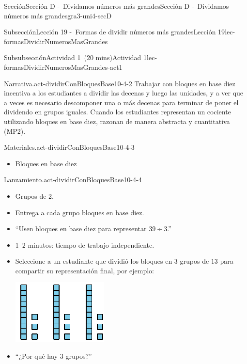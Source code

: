 \documentclass[oneside,10pt,]{article}
\begin{document}
\begin{sectionptx}{Sección}{Sección D -~Dividamos números más grandes}{}{Sección D -~Dividamos números más grandes}{}{}{gra3-uni4-secD}
\begin{subsectionptx}{Subsección}{Lección 19 -~Formas de dividir números más grandes}{}{Lección 19}{}{}{lec-formasDividirNumerosMasGrandes}
\begin{subsubsectionptx}{Subsubsección}{Actividad 1~(20 mins)}{}{Actividad 1}{}{}{lec-formasDividirNumerosMasGrandes-act1}
\begin{paragraphs}{Narrativa.}{act-dividirConBloquesBase10-4-2}
Trabajar con bloques en base diez incentiva a los estudiantes a dividir las decenas y luego las unidades, y a ver que a veces es necesario descomponer una o más decenas para terminar de poner el dividendo en grupos iguales. Cuando los estudiantes representan un cociente utilizando bloques en base diez, razonan de manera abstracta y cuantitativa (MP2).%
\end{paragraphs}%
\begin{paragraphs}{Materiales.}{act-dividirConBloquesBase10-4-3}%
%
\begin{itemize}[label=\textbullet]
\item{}Bloques en base diez%
\end{itemize}
\end{paragraphs}%
\begin{paragraphs}{Lanzamiento.}{act-dividirConBloquesBase10-4-4}%
%
\begin{itemize}[label=\textbullet]
\item{}Grupos de 2.%
\item{}Entrega a cada grupo bloques en base diez.%
\item{}``Usen bloques en base diez para representar \(39 \div 3\).''%
\item{}1–2 minutos: tiempo de trabajo independiente.%
\item{}Seleccione a un estudiante que dividió los bloques en \(3\) grupos de \(13\) para compartir su representación final, por ejemplo:%
\begin{image}{0}{1}{0}{}%
\includegraphics[width=\linewidth]{external/svg-source/tikz-file-149340.pdf}
\end{image}%
\item{}``¿Por qué hay \(3\) grupos?''%

\end{itemize}
\end{paragraphs}
\end{subsubsectionptx}
\end{subsectionptx}
\end{sectionptx}
\end{document}
